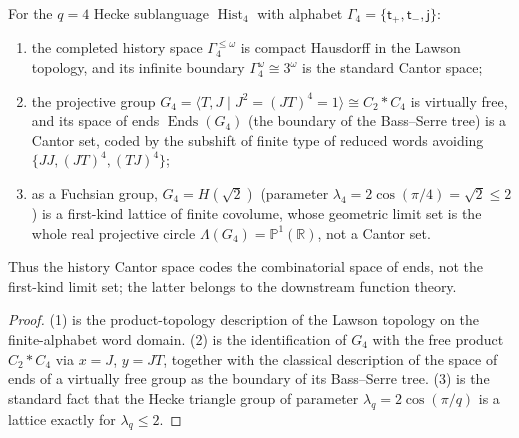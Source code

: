 \begin{proposition}
\label{prop:hecke-ends-vs-limit-set}
For the $q=4$ Hecke sublanguage $\operatorname{Hist}_4$ with alphabet
$\Gamma_4=\{\mathsf t_+,\mathsf t_-,\mathsf j\}$:
\begin{enumerate}
  \item the completed history space $\Gamma_4^{\le\omega}$ is compact Hausdorff
  in the Lawson topology, and its infinite boundary
  $\Gamma_4^\omega\cong 3^\omega$ is the standard Cantor space;
  \item the projective group $G_4=\langle T,J\mid J^2=(JT)^4=1\rangle\cong C_2*C_4$
  is virtually free, and its space of ends $\operatorname{Ends}(G_4)$ (the
  boundary of the Bass--Serre tree) is a Cantor set, coded by the subshift of
  finite type of reduced words avoiding $\{JJ,(JT)^4,(TJ)^4\}$;
  \item as a Fuchsian group, $G_4=H(\sqrt2)$ (parameter
  $\lambda_4=2\cos(\pi/4)=\sqrt2\le2$) is a first-kind lattice of finite
  covolume, whose geometric limit set is the whole real projective circle
  $\Lambda(G_4)=\mathbb P^1(\mathbb R)$, not a Cantor set.
\end{enumerate}
Thus the history Cantor space codes the combinatorial space of ends, not the
first-kind limit set; the latter belongs to the downstream function theory.
\end{proposition}

\begin{proof}
(1) is the product-topology description of the Lawson topology on the
finite-alphabet word domain.  (2) is the identification of $G_4$ with the free
product $C_2*C_4$ via $x=J$, $y=JT$, together with the classical description of
the space of ends of a virtually free group as the boundary of its Bass--Serre
tree.  (3) is the standard fact that the Hecke triangle group of parameter
$\lambda_q=2\cos(\pi/q)$ is a lattice exactly for $\lambda_q\le2$.
\end{proof}
